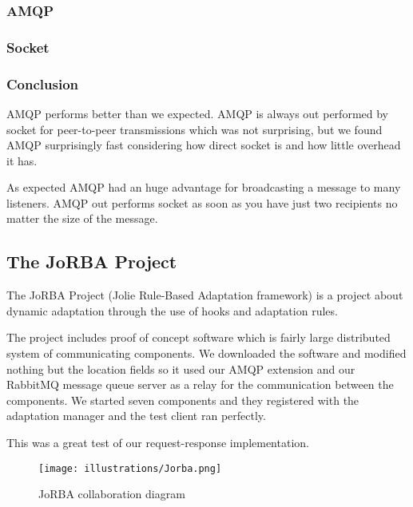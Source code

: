 \subsubsection{AMQP}





\subsubsection{Socket}

\subsubsection{Conclusion}
AMQP performs better than we expected. AMQP is always out performed by socket for peer-to-peer transmissions which was not surprising, but we found AMQP surprisingly fast considering how direct socket is and how little overhead it has.

As expected AMQP had an huge advantage for broadcasting a message to many listeners. AMQP out performs socket as soon as you have just two recipients no matter the size of the message.
\subsection{The JoRBA Project}
\label{subsec:The JoRBA Project}
The JoRBA Project\cite{Jorba} (Jolie Rule-Based Adaptation framework) is a project about dynamic adaptation through the use of hooks and adaptation rules.

The project includes proof of concept software which is fairly large distributed system of communicating components. We downloaded the software and modified nothing but the location fields so it used our AMQP extension and our RabbitMQ message queue server as a relay for the communication between the components. We started seven components and they registered with the adaptation manager and the test client ran perfectly.

This was a great test of our request-response implementation.
\begin{figure}[H]
  \texttt{[image: illustrations/Jorba.png]}
  \caption{JoRBA collaboration diagram}
\end{figure}
\newpage
